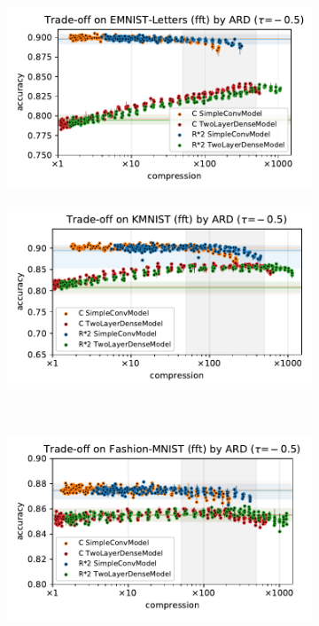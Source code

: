 \documentclass[a4paper,10pt,twocolumn]{article}
\begin{document}
\begin{figure}[b]
  \centering
  \begin{subfigure}[b]{0.5\columnwidth}
    \centering
    \includegraphics[width=\linewidth]{figure__mnist-like__trade-off/appendix__cmp__ARD__emnist_letters__fft__-0.5.pdf}
  \end{subfigure}%
  \begin{subfigure}[b]{0.5\columnwidth}
    \centering
    \includegraphics[width=\linewidth]{figure__mnist-like__trade-off/appendix__cmp__ARD__kmnist__fft__-0.5.pdf}
  \end{subfigure} \\ %
  \begin{subfigure}[b]{0.5\columnwidth}
    \centering
    \includegraphics[width=\linewidth]{figure__mnist-like__trade-off/appendix__cmp__ARD__fashionmnist__fft__-0.5.pdf}

\end{subfigure}
\end{figure}
\end{document}
